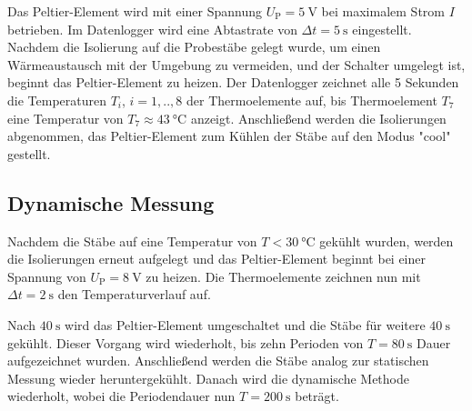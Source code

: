 Das Peltier-Element wird mit einer Spannung $U_\mathup{P}= \SI{5}{\volt}$ bei maximalem Strom $I$ betrieben. 
Im Datenlogger wird eine Abtastrate von $\Delta{t}=\SI{5}{\second}$ eingestellt. 
Nachdem die Isolierung auf die Probestäbe gelegt wurde, um einen Wärmeaustausch mit der Umgebung zu vermeiden, und der Schalter umgelegt ist, beginnt das Peltier-Element zu heizen. 
Der Datenlogger zeichnet alle 5 Sekunden die Temperaturen $T_i$, $i=1,..,8$ der Thermoelemente auf, bis Thermoelement $T_7$ eine Temperatur von $T_\mathup{7}\approx \SI{43}{\degreeCelsius}$ anzeigt. 
Anschließend werden die Isolierungen abgenommen, das Peltier-Element zum Kühlen der Stäbe auf den Modus "cool" gestellt.

\subsection{Dynamische Messung}
Nachdem die Stäbe auf eine Temperatur von $T<\SI{30}{\degreeCelsius}$ gekühlt wurden, werden die Isolierungen erneut aufgelegt und das Peltier-Element beginnt bei einer Spannung von $U_\mathup{P}=\SI{8}{\volt}$ zu heizen. Die Thermoelemente zeichnen nun mit $\Delta{t}=\SI{2}{\second}$ den Temperaturverlauf auf.

Nach $\SI{40}{\second}$ wird das Peltier-Element umgeschaltet und die Stäbe für weitere $\SI{40}{\second}$ gekühlt. 
Dieser Vorgang wird wiederholt, bis zehn Perioden von $T=\SI{80}{\second}$ Dauer aufgezeichnet wurden. 
Anschließend werden die Stäbe analog zur statischen Messung wieder heruntergekühlt. 
Danach wird die dynamische Methode wiederholt, wobei die Periodendauer nun $T=\SI{200}{\second}$ beträgt. 
